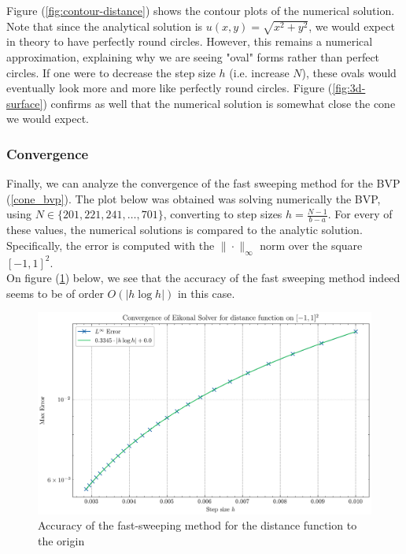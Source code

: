 \documentclass[11pt]{article}
\theoremstyle{definition}
\theoremstyle{remark}
\begin{document}
\FloatBarrier

\noindent Figure (\ref{fig:contour-distance}) shows the contour plots of the numerical solution. Note that since the analytical solution is $u(x,y)=\sqrt{x^2+y^2}$, we would expect in theory to have perfectly round circles. However, this remains a numerical approximation, explaining why we are seeing "oval" forms rather than perfect circles. If one were to decrease the step size $h$ (i.e. increase $N$), these ovals would eventually look more and more like perfectly round circles.
Figure (\ref{fig:3d-surface}) confirms as well that the numerical solution is somewhat close the cone we would expect. \\

\subsubsection{Convergence}
Finally, we can analyze the convergence of the fast sweeping method for the BVP (\ref{cone_bvp}). The plot below was obtained was solving numerically the BVP, using $N\in\{201, 221,241,\dots,701\}$, converting to step sizes $h=\frac{N-1}{b-a}$. For every of these values, the numerical solutions is compared to the analytic solution. Specifically, the error is computed with the $\|\cdot\|_\infty$ norm over the square $[-1,1]^2$. \\
On figure (\ref{fig:error_distance}) below, we see that the accuracy of the fast sweeping method indeed seems to be of order $O(|h\log h|)$ in this case.


\begin{figure}[h]
  \centering
  \includegraphics[width=0.7\linewidth]{plots/convergence2d_step_size.png}
  \caption{Accuracy of the fast-sweeping method for the distance function to the origin}
  \label{fig:error_distance}
\end{figure}
\end{document}
